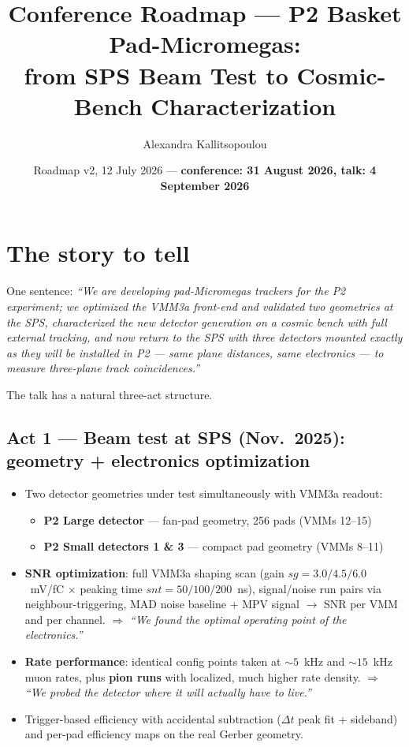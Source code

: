 \documentclass[11pt,a4paper]{article}
\title{Conference Roadmap --- P2 Basket Pad-Micromegas:\\
       from SPS Beam Test to Cosmic-Bench Characterization}
\author{Alexandra Kallitsopoulou}
\date{Roadmap v2, 12 July 2026 --- \textbf{conference: 31 August 2026, talk: 4 September 2026}}
\begin{document}
\maketitle

\section{The story to tell}

One sentence: \emph{``We are developing pad-Micromegas trackers for the P2
experiment; we optimized the VMM3a front-end and validated two geometries at
the SPS, characterized the new detector generation on a cosmic bench with full
external tracking, and now return to the SPS with three detectors mounted
exactly as they will be installed in P2 --- same plane distances, same
electronics --- to measure three-plane track coincidences.''}

The talk has a natural three-act structure.

\subsection*{Act 1 --- Beam test at SPS (Nov.\ 2025): geometry + electronics optimization}

\begin{itemize}[itemsep=2pt]
  \item Two detector geometries under test simultaneously with VMM3a readout:
    \begin{itemize}
      \item \textbf{P2 Large detector} --- fan-pad geometry, 256 pads (VMMs 12--15)
      \item \textbf{P2 Small detectors 1 \& 3} --- compact pad geometry (VMMs 8--11)
    \end{itemize}
  \item \textbf{SNR optimization}: full VMM3a shaping scan
    (gain $sg = 3.0/4.5/6.0$~mV/fC $\times$ peaking time $snt = 50/100/200$~ns),
    signal/noise run pairs via neighbour-triggering, MAD noise baseline + MPV
    signal $\rightarrow$ SNR per VMM and per channel.
    $\Rightarrow$ \emph{``We found the optimal operating point of the electronics.''}
  \item \textbf{Rate performance}: identical config points taken at
    ${\sim}5$~kHz and ${\sim}15$~kHz muon rates, plus \textbf{pion runs} with
    localized, much higher rate density.
    $\Rightarrow$ \emph{``We probed the detector where it will actually have to live.''}
  \item Trigger-based efficiency with accidental subtraction ($\Delta t$ peak
    fit + sideband) and per-pad efficiency maps on the real Gerber geometry.
\end{itemize}
\end{document}
